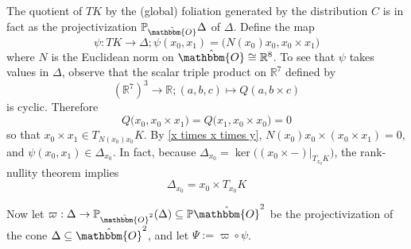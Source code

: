 \documentclass[11pt,letterpaper]{amsart}
\numberwithin{equation}{section}
\newcommand{\oct}{\hat{\mathbbm{O}}}
\begin{document}
The quotient of $TK$ by the (global) foliation generated by the distribution $C$ is in fact as the projectivization $\mathbb P_{\oct}\Delta$ of $\Delta$. Define the map
    \begin{equation}
    \label{Psi def}
        \psi: TK\to \Delta; \psi(x_0,x_1) = \big(N(x_0)x_0,x_0\times x_1\big)
    \end{equation}
    where $N$ is the Euclidean norm on $\oct\cong\mathbb{R}^8$. To see that $\psi$ takes values in $\Delta$, observe that the scalar triple product on $\mathbb{R}^7$ defined by
    \begin{equation}
        \label{def: trip prod}
        (\mathbb{R}^7)^3\to \mathbb{R}; (a,b,c)\mapsto Q(a,b\times c)
    \end{equation}
    is cyclic. Therefore
    \begin{equation}
        Q\big(x_0,x_0\times x_1\big) = Q\big(x_1,x_0\times x_0\big) = 0
    \end{equation}
    so that $x_0\times x_1\in T_{N(x_0)x_0}K$. By \eqref{x times x times y}, $N(x_0)x_0\times (x_0\times x_1) = 0$, and $\psi(x_0,x_1) \in \Delta_{x_0}$. In fact, because $\Delta_{x_0} = \ker\big((x_0\times -)|_{T_{x_0}K}\big)$, the rank-nullity theorem implies
    \begin{equation}
        \label{Delta is cross im}
        \Delta_{x_0} = x_0\times T_{x_0}K
    \end{equation}

    Now let $\varpi:\Delta\to \mathbb{P}_{\oct^2}(\Delta)\subseteq \mathbb P\oct^2$ be the projectivization of the cone $\Delta\subseteq \oct^2$, and let $\Psi:=\varpi\circ\psi$.
    
\end{document}
